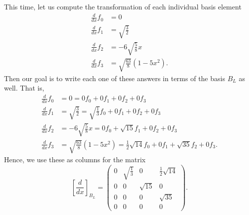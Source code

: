 \documentclass[12pt]{article} %
\begin{document}
\begin{solution}
\begin{enumerate}[(a)]
\[\]
This time, let us compute the transformation of each individual basis element
\begin{align*}
\frac{d}{dx}f_0 &= 0\\
\frac{d}{dx}f_1 &= \sqrt{\frac{3}{2}}\\
\frac{d}{dx}f_2 &= -6\sqrt{\frac{5}{8}}x\\
\frac{d}{dx}f_3 &= \sqrt{\frac{63}{8}} \left( 1 - 5 x^2 \right).
\end{align*}
Then our goal is to write each one of these answers in terms of the basis $B_L$ as well. That is,
\begin{align*}
\frac{d}{dx}f_0 &= 0 = 0f_0 + 0 f_1 + 0 f_2 + 0 f_3\\
\frac{d}{dx}f_1 &= \sqrt{\frac{3}{2}} = \sqrt{\frac{1}{3}} f_0 + 0 f_1 + 0 f_2 + 0 f_3 \\
\frac{d}{dx}f_2 &= -6\sqrt{\frac{5}{8}}x = 0f_0 + \sqrt{15}f_1 + 0 f_2 + 0 f_3 \\
\frac{d}{dx}f_3 &= \sqrt{\frac{63}{8}} \left( 1 - 5 x^2 \right) = \frac{1}{2} \sqrt{14} f_0 + 0 f_1 + \sqrt{35} f_2 + 0 f_3.
\end{align*}
Hence, we use these as columns for the matrix
\[
\left[ \frac{d}{dx}\right]_{B_L} = \begin{pmatrix} 0 & \sqrt{\frac{1}{3}} & 0 & \frac{1}{2}\sqrt{14}\\ 0 & 0 & \sqrt{15} & 0 \\ 0 & 0 & 0 &  \sqrt{35} \\ 0 & 0  & 0 & 0 \end{pmatrix}.
\]
\end{enumerate}
\end{solution}
\end{document}
